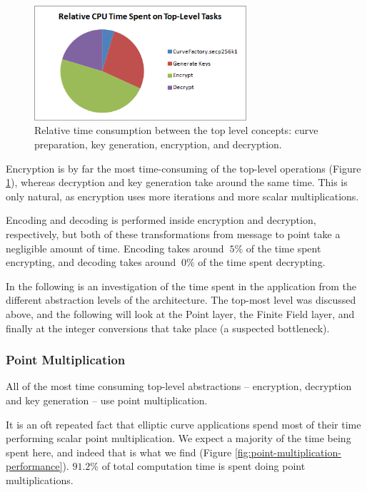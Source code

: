 \begin{figure}[htb]
	\centering
	\includegraphics[width=0.70\textwidth]{performance/top-level--relative-time}
	\caption{Relative time consumption between the top level concepts: curve preparation, key generation, encryption, and decryption.}
	\label{fig:toplevel-performance}
\end{figure}

Encryption is by far the most time-consuming of the top-level operations (Figure \ref{fig:toplevel-performance}), whereas decryption and
key generation take around the same time. This is only natural, as encryption uses more iterations and more scalar multiplications.

Encoding and decoding is performed inside encryption and decryption, respectively, but both of these transformations from message to
point take a negligible amount of time. Encoding takes around \(~5\%\) of the time spent encrypting, and decoding takes around \(~0\%\)
of the time spent decrypting.

In the following is an investigation of the time spent in the application from the different abstraction levels of the architecture.
The top-most level was discussed above, and the following will look at the Point layer, the Finite Field layer, and finally at the
integer conversions that take place (a suspected bottleneck).

\subsubsection{Point Multiplication}
\label{sec:performance_components_multiplication}

All of the most time consuming top-level abstractions -- encryption, decryption and key generation -- use point multiplication.

It is an oft repeated fact that elliptic curve applications spend most of their time performing scalar point multiplication. We expect a
majority of the time being spent here, and indeed that is what we find (Figure \ref{fig:point-multiplication-performance}). \(91.2\%\) of
total computation time is spent doing point multiplications.

